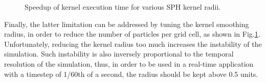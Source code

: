 \begin{figure}[htb!]
    \centering
    \caption{Speedup of kernel execution time for various SPH kernel radii.}\label{fig:radius_speedup}
\end{figure}

\noindent
Finally, the latter limitation can be addressed by tuning the kernel smoothing radius, in order to reduce the number of particles per grid cell, as shown in Fig.\ref{fig:radius_speedup}. Unfortunately, reducing the kernel radius too much increases the instability of the simulation. Such instability is also inversely proportional to the temporal resolution of the simulation, thus, in order to be used in a real-time application with a timestep of 1/60th of a second, the radius should be kept above 0.5 units.